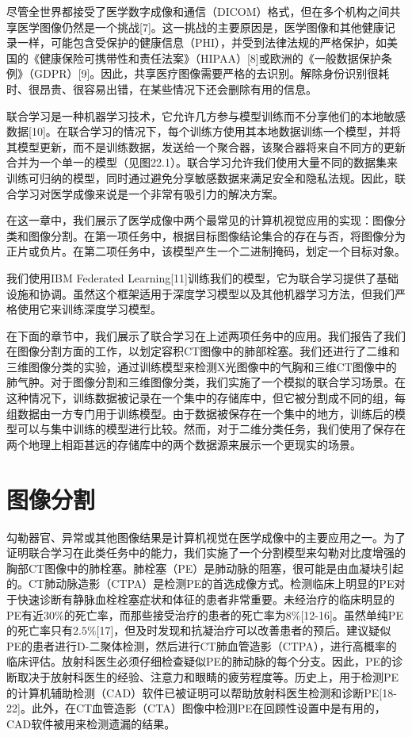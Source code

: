 尽管全世界都接受了医学数字成像和通信（DICOM）格式，但在多个机构之间共享医学图像仍然是一个挑战[7]。这一挑战的主要原因是，医学图像和其他健康记录一样，可能包含受保护的健康信息（PHI），并受到法律法规的严格保护，如美国的《健康保险可携带性和责任法案》（HIPAA）[8]或欧洲的《一般数据保护条例》（GDPR）[9]。因此，共享医疗图像需要严格的去识别。解除身份识别很耗时、很昂贵、很容易出错，在某些情况下还会删除有用的信息。

联合学习是一种机器学习技术，它允许几方参与模型训练而不分享他们的本地敏感数据[10]。在联合学习的情况下，每个训练方使用其本地数据训练一个模型，并将其模型更新，而不是训练数据，发送给一个聚合器，该聚合器将来自不同方的更新合并为一个单一的模型（见图22.1）。联合学习允许我们使用大量不同的数据集来训练可归纳的模型，同时通过避免分享敏感数据来满足安全和隐私法规。因此，联合学习对医学成像来说是一个非常有吸引力的解决方案。

在这一章中，我们展示了医学成像中两个最常见的计算机视觉应用的实现：图像分类和图像分割。在第一项任务中，根据目标图像结论集合的存在与否，将图像分为正片或负片。在第二项任务中，该模型产生一个二进制掩码，划定一个目标对象。

我们使用IBM Federated Learning[11]训练我们的模型，它为联合学习提供了基础设施和协调。虽然这个框架适用于深度学习模型以及其他机器学习方法，但我们严格使用它来训练深度学习模型。

在下面的章节中，我们展示了联合学习在上述两项任务中的应用。我们报告了我们在图像分割方面的工作，以划定容积CT图像中的肺部栓塞。我们还进行了二维和三维图像分类的实验，通过训练模型来检测X光图像中的气胸和三维CT图像中的肺气肿。对于图像分割和三维图像分类，我们实施了一个模拟的联合学习场景。在这种情况下，训练数据被记录在一个集中的存储库中，但它被分割成不同的组，每组数据由一方专门用于训练模型。由于数据被保存在一个集中的地方，训练后的模型可以与集中训练的模型进行比较。然而，对于二维分类任务，我们使用了保存在两个地理上相距甚远的存储库中的两个数据源来展示一个更现实的场景。

\section{图像分割}
勾勒器官、异常或其他图像结果是计算机视觉在医学成像中的主要应用之一。为了证明联合学习在此类任务中的能力，我们实施了一个分割模型来勾勒对比度增强的胸部CT图像中的肺栓塞。肺栓塞（PE）是肺动脉的阻塞，很可能是由血凝块引起的。CT肺动脉造影（CTPA）是检测PE的首选成像方式。检测临床上明显的PE对于快速诊断有静脉血栓栓塞症状和体征的患者非常重要。未经治疗的临床明显的PE有近$30\%$的死亡率，而那些接受治疗的患者的死亡率为$8\%$[12-16]。虽然单纯PE的死亡率只有$2.5\%$[17]，但及时发现和抗凝治疗可以改善患者的预后。建议疑似PE的患者进行D-二聚体检测，然后进行CT肺血管造影（CTPA），进行高概率的临床评估。放射科医生必须仔细检查疑似PE的肺动脉的每个分支。因此，PE的诊断取决于放射科医生的经验、注意力和眼睛的疲劳程度等。历史上，用于检测PE的计算机辅助检测（CAD）软件已被证明可以帮助放射科医生检测和诊断PE[18-22]。此外，在CT血管造影（CTA）图像中检测PE在回顾性设置中是有用的，CAD软件被用来检测遗漏的结果。

